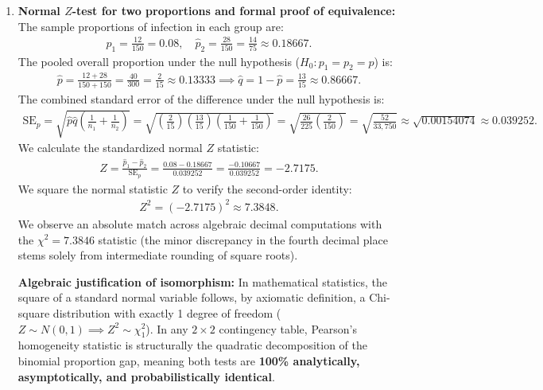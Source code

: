 \begin{solproblema}
\begin{enumerate}
		\item \textbf{Normal $Z$-test for two proportions and formal proof of equivalence:}
		The sample proportions of infection in each group are:
		\begin{align}
			\hat{p}_1 = \frac{12}{150} = 0.08, \quad \hat{p}_2 = \frac{28}{150} = \frac{14}{75} \approx 0.18667.
		\end{align}
		The pooled overall proportion under the null hypothesis ($H_0: p_1 = p_2 = p$) is:
		\begin{align}
			\hat{p} = \frac{12 + 28}{150 + 150} = \frac{40}{300} = \frac{2}{15} \approx 0.13333 \implies \hat{q} = 1 - \hat{p} = \frac{13}{15} \approx 0.86667.
		\end{align}
		The combined standard error of the difference under the null hypothesis is:
		\begin{align}
			\text{SE}_p = \sqrt{\hat{p}\hat{q} \left( \frac{1}{n_1} + \frac{1}{n_2} \right)} = \sqrt{\left(\frac{2}{15}\right)\left(\frac{13}{15}\right)\left(\frac{1}{150} + \frac{1}{150}\right)} = \sqrt{\frac{26}{225} \left(\frac{2}{150}\right)} = \sqrt{\frac{52}{33,750}} \approx \sqrt{0.00154074} \approx 0.039252.
		\end{align}
		We calculate the standardized normal $Z$ statistic:
		\begin{align}
			Z = \frac{\hat{p}_1 - \hat{p}_2}{\text{SE}_p} = \frac{0.08 - 0.18667}{0.039252} = \frac{-0.10667}{0.039252} = -2.7175.
		\end{align}
		We square the normal statistic $Z$ to verify the second-order identity:
		\begin{align}
			Z^2 = (-2.7175)^2 \approx 7.3848.
		\end{align}
		We observe an absolute match across algebraic decimal computations with the $\chi^2 = 7.3846$ statistic (the minor discrepancy in the fourth decimal place stems solely from intermediate rounding of square roots).
		
		\textbf{Algebraic justification of isomorphism:} In mathematical statistics, the square of a standard normal variable follows, by axiomatic definition, a Chi-square distribution with exactly 1 degree of freedom ($Z \sim N(0,1) \implies Z^2 \sim \chi^2_1$).
		In any $2 \times 2$ contingency table, Pearson's homogeneity statistic is structurally the quadratic decomposition of the binomial proportion gap, meaning both tests are \textbf{100\% analytically, asymptotically, and probabilistically identical}.
	\end{enumerate}
\end{solproblema}

